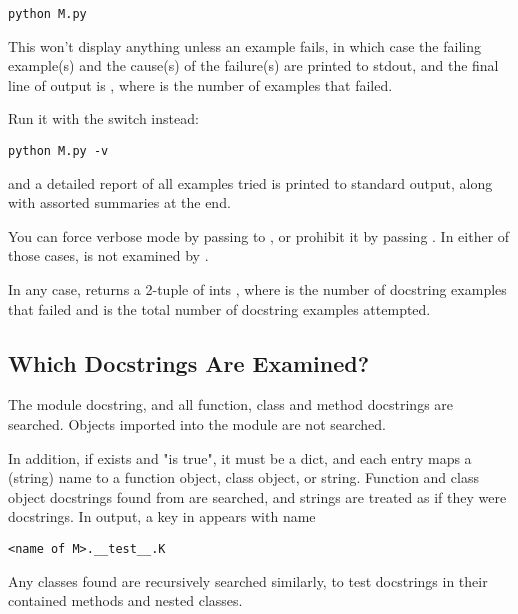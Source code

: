 \begin{verbatim}
python M.py
\end{verbatim}

This won't display anything unless an example fails, in which case the
failing example(s) and the cause(s) of the failure(s) are printed to stdout,
and the final line of output is
, where  is the
number of examples that failed.

Run it with the  switch instead:

\begin{verbatim}
python M.py -v
\end{verbatim}

and a detailed report of all examples tried is printed to standard
output, along with assorted summaries at the end.

You can force verbose mode by passing  to
, or
prohibit it by passing .  In either of those cases,
 is not examined by .

In any case,  returns a 2-tuple of ints , where  is the number of docstring examples that
failed and  is the total number of docstring examples
attempted.

\subsection{Which Docstrings Are Examined?}

The module docstring, and all function, class and method docstrings are
searched.  Objects imported into the module are not searched.

In addition, if  exists and "is true", it must be a
dict, and each entry maps a (string) name to a function object, class
object, or string.  Function and class object docstrings found from
 are searched, and strings are treated as if they
were docstrings.  In output, a key  in  appears
with name

\begin{verbatim}
<name of M>.__test__.K
\end{verbatim}

Any classes found are recursively searched similarly, to test docstrings in
their contained methods and nested classes.



